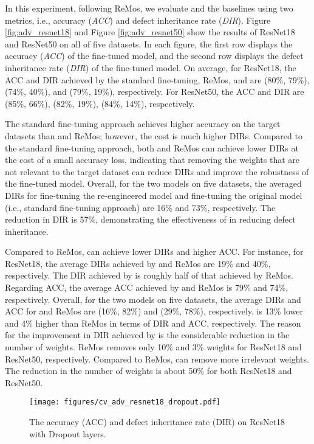 In this experiment, following ReMos, we evaluate \projectName and the baselines using two metrics, i.e., accuracy (\textit{ACC}) and defect inheritance rate (\textit{DIR}).
Figure \ref{fig:adv_resnet18} and Figure \ref{fig:adv_resnet50} show the results of ResNet18 and ResNet50 on all of five datasets. 
In each figure, the first row displays the accuracy (\textit{ACC}) of the fine-tuned model, and the second row displays the defect inheritance rate (\textit{DIR}) of the fine-tuned model.
On average, for ResNet18, the ACC and DIR achieved by the standard fine-tuning, ReMos, and \projectName are (80\%, 79\%), (74\%, 40\%), and (79\%, 19\%), respectively. For ResNet50, the ACC and DIR are (85\%, 66\%), (82\%, 19\%), (84\%, 14\%), respectively.

The standard fine-tuning approach achieves higher accuracy on the target datasets than \projectName and ReMos; however, the cost is much higher DIRs.
Compared to the standard fine-tuning approach, both \projectName and ReMos can achieve lower DIRs at the cost of a small accuracy loss, indicating that removing the weights that are not relevant to the target dataset can reduce DIRs and improve the robustness of the fine-tuned model.
Overall, for the two models on five datasets, the averaged DIRs for fine-tuning the re-engineered model and fine-tuning the original model (i.e., standard fine-tuning approach) are 16\% and 73\%, respectively.
The reduction in DIR is 57\%, demonstrating the effectiveness of \projectName in reducing defect inheritance.

Compared to ReMos, \projectName can achieve lower DIRs and higher ACC.
For instance, for ResNet18, the average DIRs achieved by \projectName and ReMos are 19\% and 40\%, respectively. The DIR achieved by \projectName is roughly half of that achieved by ReMos.
Regarding ACC, the average ACC achieved by \projectName and ReMos is 79\% and 74\%, respectively. 
Overall, for the two models on five datasets, the average DIRs and ACC for \projectName and ReMos are (16\%, 82\%) and (29\%, 78\%), respectively.
\projectName is 13\% lower and 4\% higher than ReMos in terms of DIR and ACC, respectively.
The reason for the improvement in DIR achieved by \projectName is the considerable reduction in the number of weights.
ReMos removes only 10\% and 3\% weights for ResNet18 and ResNet50, respectively.
Compared to ReMos, \projectName can remove more irrelevant weights. 
The reduction in the number of weights is about 50\% for both ResNet18 and ResNet50.

\begin{figure}
    \centering
    \texttt{[image: figures/cv\_adv\_resnet18\_dropout.pdf]}
    \caption{The accuracy (ACC) and defect inheritance rate (DIR) on ResNet18 with Dropout layers.}
    \label{fig:adv_resnet18_dropout}
\end{figure}

